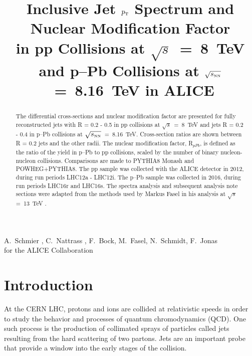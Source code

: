 \documentclass[ALICE]{ALICE_analysis_notes}
\newcommand{\pT}{$p_{\mbox{\tiny T}}$\xspace}
\newcommand{\sNN}{$\sqrt{s_{\mbox{\tiny NN}}}$\xspace}
\newcommand{\s}{$\sqrt{s}$\xspace}
\newcommand{\pPb}{{\mbox{p--Pb}}\xspace}
\newcommand{\pp}{pp\xspace}
\begin{document}
\title{Inclusive Jet \pT Spectrum and Nuclear Modification Factor\\ in pp Collisions at \s~=~8~TeV and p--Pb Collisions at \sNN~=~8.16~TeV in ALICE}


\begin{Authlist}
A.~Schmier ,
C.~Nattrass ,
F.~Bock, 
M.~Fasel,
N.~Schmidt,
F.~Jonas\\
for the ALICE Collaboration
\end{Authlist}



\vspace{4cm}
\begin{abstract}
The differential cross-sections and nuclear modification factor are presented for fully reconstructed jets with R = 0.2 - 0.5 in \pp collisions at \s~=~8~TeV and jets R = 0.2 - 0.4 in \pPb collisions at \sNN~=~8.16~TeV. Cross-section ratios are shown between R = 0.2 jets and the other radii. The nuclear modification factor, R$_{pPb}$, is defined as the ratio of the yield in \pPb to \pp collisions, scaled by the number of binary nucleon-nucleon collisions. Comparisons are made to PYTHIA8 Monash and POWHEG+PYTHIA8. The \pp sample was collected with the ALICE detector in 2012, during run periods LHC12a - LHC12i. The \pPb sample was collected in 2016, during run periods LHC16r and LHC16s. The spectra analysis and subsequent analysis note sections were adapted from the methods used by Markus Fasel in his analysis at \s =~13~TeV \cite{anaNoteMFasel}.
\end{abstract}

\newpage

\tableofcontents

\clearpage{}\section{Introduction}
\label{chap:Introduction}

At the CERN LHC, protons and ions are collided at relativistic speeds in order to study the behavior and processes of quantum chromodynamics (QCD). One such process is the production of collimated sprays of particles called jets resulting from the hard scattering of two partons. Jets are an important probe that provide a window into the early stages of the collision.
\end{document}
